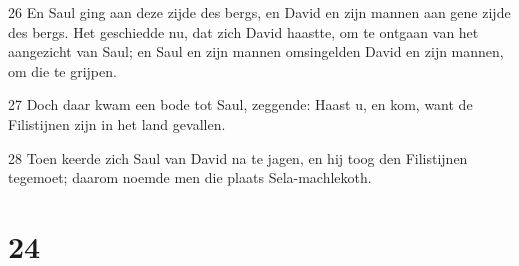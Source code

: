 \par 26 En Saul ging aan deze zijde des bergs, en David en zijn mannen aan gene zijde des bergs. Het geschiedde nu, dat zich David haastte, om te ontgaan van het aangezicht van Saul; en Saul en zijn mannen omsingelden David en zijn mannen, om die te grijpen.
\par 27 Doch daar kwam een bode tot Saul, zeggende: Haast u, en kom, want de Filistijnen zijn in het land gevallen.
\par 28 Toen keerde zich Saul van David na te jagen, en hij toog den Filistijnen tegemoet; daarom noemde men die plaats Sela-machlekoth.

\chapter{24}

